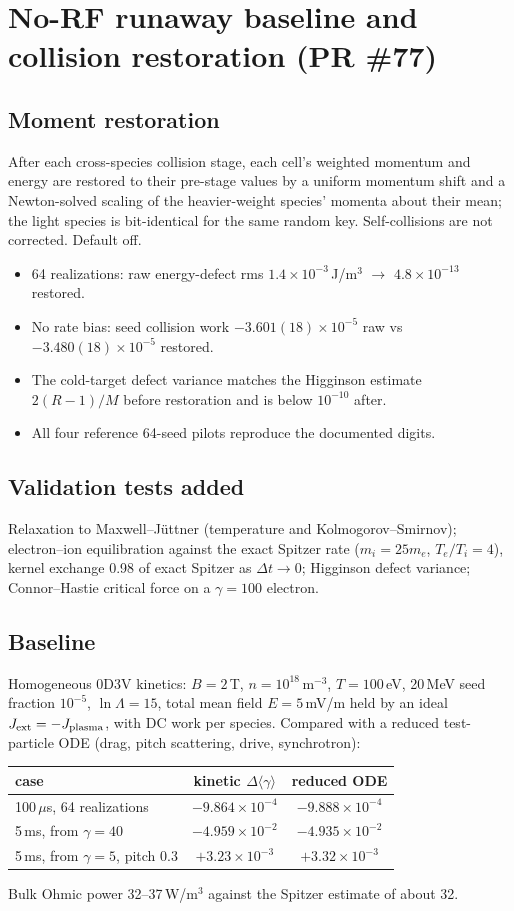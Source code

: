 \documentclass[10pt,a4paper]{article}
\begin{document}
\section{No-RF runaway baseline and collision restoration (PR \#77)}
\subsection{Moment restoration}
After each cross-species collision stage, each cell's weighted momentum and energy are restored to their
pre-stage values by a uniform momentum shift and a Newton-solved scaling of the heavier-weight species'
momenta about their mean; the light species is bit-identical for the same random key. Self-collisions are
not corrected. Default off.
\begin{itemize}
\item 64 realizations: raw energy-defect rms $1.4\times10^{-3}$\,J/m$^3$ $\to$ $4.8\times10^{-13}$ restored.
\item No rate bias: seed collision work $-3.601(18)\times10^{-5}$ raw vs $-3.480(18)\times10^{-5}$ restored.
\item The cold-target defect variance matches the Higginson estimate $2(R-1)/M$ before restoration and is below $10^{-10}$ after.
\item All four reference 64-seed pilots reproduce the documented digits.
\end{itemize}

\subsection{Validation tests added}
Relaxation to Maxwell--Jüttner (temperature and Kolmogorov--Smirnov); electron--ion equilibration against the
exact Spitzer rate ($m_i=25m_e$, $T_e/T_i=4$), kernel exchange 0.98 of exact Spitzer as $\Delta t\to0$;
Higginson defect variance; Connor--Hastie critical force on a $\gamma=100$ electron.

\subsection{Baseline}
Homogeneous 0D3V kinetics: $B=2$\,T, $n=10^{18}$\,m$^{-3}$, $T=100$\,eV, 20\,MeV seed fraction $10^{-5}$,
$\ln\Lambda=15$, total mean field $E=5$\,mV/m held by an ideal $J_{\rm ext}=-J_{\rm plasma}$, with DC work per
species. Compared with a reduced test-particle ODE (drag, pitch scattering, drive, synchrotron):
\begin{table}[H]\centering\small\begin{tabular}{@{}lcc@{}}\toprule
case & kinetic $\Delta\langle\gamma\rangle$ & reduced ODE\\\midrule
100\,$\mu$s, 64 realizations & $-9.864\times10^{-4}$ & $-9.888\times10^{-4}$\\
5\,ms, from $\gamma=40$ & $-4.959\times10^{-2}$ & $-4.935\times10^{-2}$\\
5\,ms, from $\gamma=5$, pitch 0.3 & $+3.23\times10^{-3}$ & $+3.32\times10^{-3}$\\\bottomrule
\end{tabular}\end{table}
Bulk Ohmic power 32--37\,W/m$^3$ against the Spitzer estimate of about 32.
\end{document}
